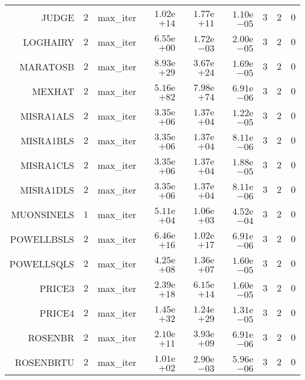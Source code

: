 \begin{longtable}{rrrrrrrrr}
JUDGE & \(     2\) & max\_iter & \( 1.02\)e\(+14\) & \( 1.77\)e\(+11\) & \( 1.10\)e\(-05\) & \(     3\) & \(     2\) & \(     0\) \\
LOGHAIRY & \(     2\) & max\_iter & \( 6.55\)e\(+00\) & \( 1.72\)e\(-03\) & \( 2.00\)e\(-05\) & \(     3\) & \(     2\) & \(     0\) \\
MARATOSB & \(     2\) & max\_iter & \( 8.93\)e\(+29\) & \( 3.67\)e\(+24\) & \( 1.69\)e\(-05\) & \(     3\) & \(     2\) & \(     0\) \\
MEXHAT & \(     2\) & max\_iter & \( 5.16\)e\(+82\) & \( 7.98\)e\(+74\) & \( 6.91\)e\(-06\) & \(     3\) & \(     2\) & \(     0\) \\
MISRA1ALS & \(     2\) & max\_iter & \( 3.35\)e\(+06\) & \( 1.37\)e\(+04\) & \( 1.22\)e\(-05\) & \(     3\) & \(     2\) & \(     0\) \\
MISRA1BLS & \(     2\) & max\_iter & \( 3.35\)e\(+06\) & \( 1.37\)e\(+04\) & \( 8.11\)e\(-06\) & \(     3\) & \(     2\) & \(     0\) \\
MISRA1CLS & \(     2\) & max\_iter & \( 3.35\)e\(+06\) & \( 1.37\)e\(+04\) & \( 1.88\)e\(-05\) & \(     3\) & \(     2\) & \(     0\) \\
MISRA1DLS & \(     2\) & max\_iter & \( 3.35\)e\(+06\) & \( 1.37\)e\(+04\) & \( 8.11\)e\(-06\) & \(     3\) & \(     2\) & \(     0\) \\
MUONSINELS & \(     1\) & max\_iter & \( 5.11\)e\(+04\) & \( 1.06\)e\(+03\) & \( 4.52\)e\(-04\) & \(     3\) & \(     2\) & \(     0\) \\
POWELLBSLS & \(     2\) & max\_iter & \( 6.46\)e\(+16\) & \( 1.02\)e\(+17\) & \( 6.91\)e\(-06\) & \(     3\) & \(     2\) & \(     0\) \\
POWELLSQLS & \(     2\) & max\_iter & \( 4.25\)e\(+08\) & \( 1.36\)e\(+07\) & \( 1.60\)e\(-05\) & \(     3\) & \(     2\) & \(     0\) \\
PRICE3 & \(     2\) & max\_iter & \( 2.39\)e\(+18\) & \( 6.15\)e\(+14\) & \( 1.60\)e\(-05\) & \(     3\) & \(     2\) & \(     0\) \\
PRICE4 & \(     2\) & max\_iter & \( 1.45\)e\(+32\) & \( 1.24\)e\(+29\) & \( 1.31\)e\(-05\) & \(     3\) & \(     2\) & \(     0\) \\
ROSENBR & \(     2\) & max\_iter & \( 2.10\)e\(+11\) & \( 3.93\)e\(+09\) & \( 6.91\)e\(-06\) & \(     3\) & \(     2\) & \(     0\) \\
ROSENBRTU & \(     2\) & max\_iter & \( 1.01\)e\(+02\) & \( 2.90\)e\(-03\) & \( 5.96\)e\(-06\) & \(     3\) & \(     2\) & \(     0\) \\

\end{longtable}
